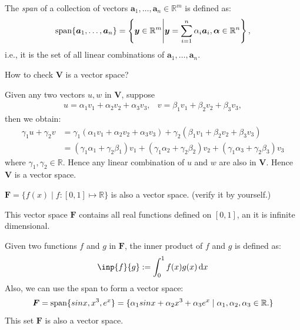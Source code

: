 \begin{example}
\begin{definition}[Span]
The \emph{span} of a collection of vectors $\bm a_1,\dots,\bm a_n\in\mathbb{R}^m$ is defined as:
\[
\operatorname{span}\{\bm a_1,\dots,\bm a_n\}
=\left\{
\bm y\in\mathbb{R}^m\middle|\bm y=\sum_{i=1}^n\alpha_i\bm a_i, \bm\alpha\in\mathbb{R}^n
\right\},
\]
i.e., it is the set of all linear combinations of $\bm a_1,\dots,\bm a_n$.
\end{definition}

How to check $\bm V$ is a vector space?

Given any two vectors $u,w$ in $\bm V$, suppose 
\[
\begin{array}{ll}
u = \alpha_1v_1+\alpha_2v_2+\alpha_3v_3,
&
v=\beta_1v_1+\beta_2v_2+\beta_3v_3,
\end{array} 
\] 
then we obtain:
\[
\begin{split}
\gamma_1u+\gamma_2v &= \gamma_1(\alpha_1v_1+\alpha_2v_2+\alpha_3v_3)+\gamma_2(\beta_1v_1+\beta_2v_2+\beta_3v_3) \\&= (\gamma_1\alpha_1+\gamma_2\beta_1)v_1+(\gamma_1\alpha_2+\gamma_2\beta_2)v_2+(\gamma_1\alpha_3+\gamma_2\beta_3)v_3
\end{split}
\]
where $\gamma_1,\gamma_2\in\mathbb{R}$. Hence any linear combination of $u$ and $w$ are also in $\bm V$. Hence $\bm V$ is a vector space.
\end{example}
\begin{example}
$\bm F = \{f(x) \mid f:[0,1]\mapsto \mathbb{R}\}$ is also a vector space. (verify it by yourself.) 

This vector space $\bm F$ contains all real functions defined on $[0,1]$, an it is infinite dimensional. 

Given two functions $f$ and $g$ in $\bm F$, the inner product of $f$ and $g$ is defined as:
\[
\inp{f}{g} := \int_0^1f(x)g(x)\diff x
\]
Also, we can use the span to form a vector space:
\[
\bm F = \operatorname{span}\{sinx,x^3,e^x\} = \{\alpha_1sinx+\alpha_2x^3+\alpha_3e^x\mid \alpha_1,\alpha_2,\alpha_3\in\mathbb{R}.\}
\]
This set $\bm F$ is also a vector space.
\end{example}
